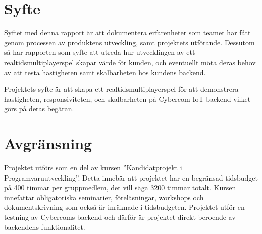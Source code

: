 \section{Syfte}
\label{sec:aim}
Syftet med denna rapport är att dokumentera erfarenheter som teamet har fått genom processen av produktens utveckling, samt projektets utförande. Dessutom så
 har rapporten som syfte att utreda hur utvecklingen av ett realtidsmultiplayerspel skapar värde för kunden, och eventuellt möta deras behov av att testa hastigheten samt skalbarheten hos kundens backend.


Projektets syfte är att skapa ett realtidsmultiplayerspel för att demonstrera hastigheten, responsiviteten, och skalbarheten på Cybercom IoT-backend vilket görs på deras begäran.
\section{Avgränsning}
\label{sec:delimitations}

Projektet utförs som en del av kursen ''Kandidatprojekt i Programvaruutveckling''. Detta innebär att projektet har en begränsad tidsbudget på 400 timmar
per gruppmedlem, det vill säga 3200 timmar totalt. Kursen innefattar obligatoriska seminarier, föreläsningar, workshops och dokumentskrivning som också är inräknade i tidsbudgeten.
Projektet utför en testning av Cybercoms backend och därför är projektet direkt beroende av backendens funktionalitet.
